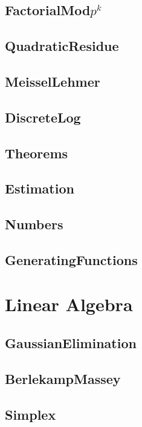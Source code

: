 \subsection{FactorialMod$p^k$}

\subsection{QuadraticResidue}

\subsection{MeisselLehmer}

\subsection{DiscreteLog}

\subsection{Theorems}

\subsection{Estimation}

\subsection{Numbers}

\subsection{GeneratingFunctions}

\section{Linear Algebra}
\subsection{GaussianElimination}

\subsection{BerlekampMassey}

\subsection{Simplex}


